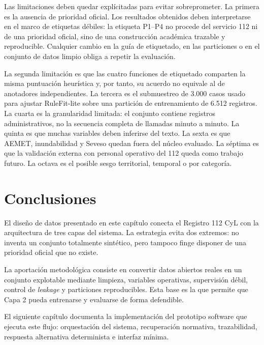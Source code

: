 Las limitaciones deben quedar explícitadas para evitar sobreprometer. La primera es la ausencia de prioridad oficial. Los resultados obtenidos deben interpretarse en el marco de etiquetas débiles: la etiqueta P1--P4 no procede del servicio 112 ni de una prioridad oficial, sino de una construcción académica trazable y reproducible. Cualquier cambio en la guía de etiquetado, en las particiones o en el conjunto de datos limpio obliga a repetir la evaluación.

La segunda limitación es que las cuatro funciones de etiquetado comparten la misma puntuación heurística y, por tanto, su acuerdo no equivale al de anotadores independientes. La tercera es el submuestreo de 3.000 casos usado para ajustar RuleFit-lite sobre una partición de entrenamiento de 6.512 registros. La cuarta es la granularidad limitada: el conjunto contiene registros administrativos, no la secuencia completa de llamadas minuto a minuto. La quinta es que muchas variables deben inferirse del texto. La sexta es que AEMET, inundabilidad y Seveso quedan fuera del núcleo evaluado. La séptima es que la validación externa con personal operativo del 112 queda como trabajo futuro. La octava es el posible sesgo territorial, temporal o por categoría.

\section{Conclusiones}

El diseño de datos presentado en este capítulo conecta el Registro 112 CyL con la arquitectura de tres capas del sistema. La estrategia evita dos extremos: no inventa un conjunto totalmente sintético, pero tampoco finge disponer de una prioridad oficial que no existe.

La aportación metodológica consiste en convertir datos abiertos reales en un conjunto explotable mediante limpieza, variables operativas, supervisión débil, control de \textit{leakage} y particiones reproducibles. Esta base es la que permite que Capa 2 pueda entrenarse y evaluarse de forma defendible.

El siguiente capítulo documenta la implementación del prototipo software que ejecuta este flujo: orquestación del sistema, recuperación normativa, trazabilidad, respuesta alternativa determinista e interfaz mínima.
